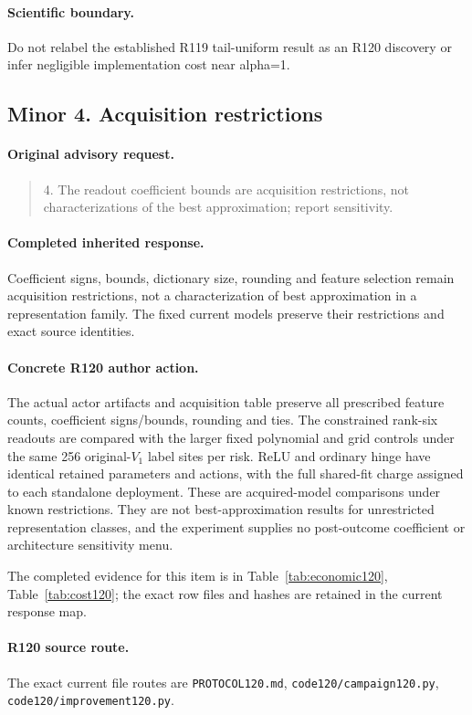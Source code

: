 \paragraph{Scientific boundary.}
Do not relabel the established R119 tail-uniform result as an R120 discovery or infer negligible implementation cost near alpha=1.

\subsection{Minor 4. Acquisition restrictions}
\label{response120:minor-4}
\paragraph{Original advisory request.}
\begin{quote}
4. The readout coefficient bounds are acquisition restrictions, not characterizations of the best approximation; report sensitivity.
\end{quote}
\paragraph{Completed inherited response.}
Coefficient signs, bounds, dictionary size, rounding and feature selection remain acquisition restrictions, not a characterization of best approximation in a representation family. The fixed current models preserve their restrictions and exact source identities.
\paragraph{Concrete R120 author action.}
The actual actor artifacts and acquisition table preserve all prescribed feature counts, coefficient signs/bounds, rounding and ties. The constrained rank-six readouts are compared with the larger fixed polynomial and grid controls under the same 256 original-$V_1$ label sites per risk. ReLU and ordinary hinge have identical retained parameters and actions, with the full shared-fit charge assigned to each standalone deployment. These are acquired-model comparisons under known restrictions. They are not best-approximation results for unrestricted representation classes, and the experiment supplies no post-outcome coefficient or architecture sensitivity menu.

The completed evidence for this item is in Table~\ref{tab:economic120}, Table~\ref{tab:cost120}; the exact row files and hashes are retained in the current response map.
\paragraph{R120 source route.}
The exact current file routes are \nolinkurl{PROTOCOL120.md}, \nolinkurl{code120/campaign120.py}, \nolinkurl{code120/improvement120.py}.
